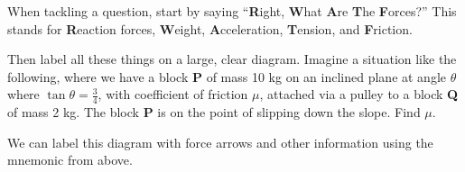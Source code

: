 \documentclass[../main.tex]{subfile}
\begin{document}


When tackling a question, start by saying \enquote{\textbf{R}ight, \textbf{W}hat \textbf{A}re \textbf{T}he \textbf{F}orces?} This stands for \textbf{R}eaction forces, \textbf{W}eight, \textbf{A}cceleration, \textbf{T}ension, and \textbf{F}riction.

Then label all these things on a large, clear diagram. Imagine a situation like the following, where we have a block \textbf{P} of mass 10 kg on an inclined plane at angle $\theta$ where $\tan\theta = \frac{3}{4}$, with coefficient of friction $\mu$, attached via a pulley to a block \textbf{Q} of mass 2 kg. The block \textbf{P} is on the point of slipping down the slope. Find $\mu$.

\begin{center}
\end{center}

We can label this diagram with force arrows and other information using the mnemonic from above.
\end{document}
